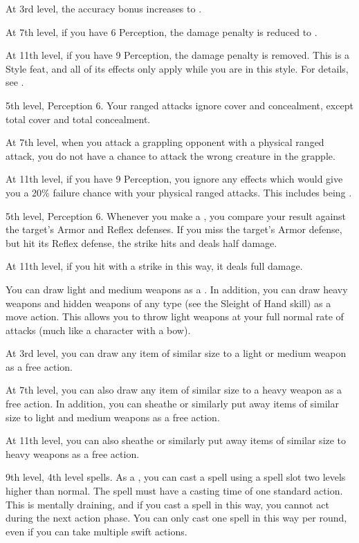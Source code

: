     At 3rd level, the accuracy bonus increases to .

    At 7th level, if you have 6 Perception, the damage penalty is reduced to .

    At 11th level, if you have 9 Perception, the damage penalty is removed.
     This is a Style feat, and all of its effects only apply while you are in this style.
    For details, see .

    \featpres 5th level, Perception 6.
    \featben Your ranged attacks ignore cover and concealment, except total cover and total concealment.

    At 7th level, when you attack a grappling opponent with a physical ranged attack, you do not have a chance to attack the wrong creature in the grapple.

    At 11th level, if you have 9 Perception, you ignore any effects which would give you a 20\% failure chance with your physical ranged attacks.
    This includes being \impaired.

    \featpre 5th level, Perception 6.
    \featben Whenever you make a , you compare your result against the target's Armor and Reflex defenses.
    If you miss the target's Armor defense, but hit its Reflex defense, the strike hits and deals half damage.

    At 11th level, if you hit with a strike in this way, it deals full damage.

    \featben You can draw light and medium weapons as a .
    In addition, you can draw heavy weapons and hidden weapons of any type (see the Sleight of Hand skill) as a move action.
    This allows you to throw light weapons at your full normal rate of attacks (much like a character with a bow).

    At 3rd level, you can draw any item of similar size to a light or medium weapon as a free action.

    At 7th level, you can also draw any item of similar size to a heavy weapon as a free action.
    In addition, you can sheathe or similarly put away items of similar size to light and medium weapons as a free action.

    At 11th level, you can also sheathe or similarly put away items of similar size to heavy weapons as a free action.

    \featpre 9th level, 4th level spells.
    \featben As a , you can cast a spell using a spell slot two levels higher than normal.
    The spell must have a casting time of one standard action.
    This is mentally draining, and if you cast a spell in this way, you cannot act during the next action phase.
    You can only cast one spell in this way per round, even if you can take multiple swift actions.


